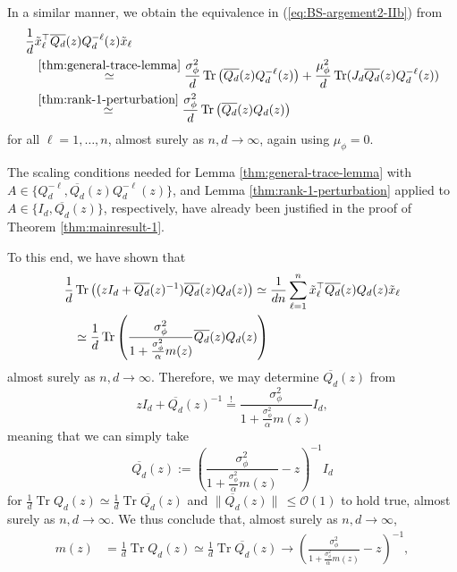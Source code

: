 \documentclass{article}
\begin{document}
\bigskip
\par
In a similar manner, we obtain the equivalence in (\ref{eq:BS-argement2-IIb}) from
\begin{align}
\frac{1}{d}&\tilde{x}_\ell^\top\overline{Q_{d}}(z)Q_{d}^{-\ell}(z)\tilde{x}_\ell 
\\ &\stackrel{\ref{thm:general-trace-lemma}}{\simeq} \frac{\sigma_\phi^2}{d}\operatorname{Tr}\left(\overline{Q_{d}}(z)Q_{d}^{-\ell}(z)\right) + \frac{\mu_\phi^2}{d}\operatorname{Tr}(J_{d}\overline{Q_{d}}(z)Q_{d}^{-\ell}(z))\label{eq:mu=0-remark}
\\ &\stackrel{\ref{thm:rank-1-perturbation}}{\simeq} \frac{\sigma_\phi^2}{d}\operatorname{Tr}\left(\overline{Q_{d}}(z)Q_{d}(z)\right)
\end{align}
for all $\ell=1,\dots,n$, almost surely as $n,d\to\infty$, again using $\mu_\phi=0$.
\bigskip
\par
The scaling conditions needed for Lemma \ref{thm:general-trace-lemma} with $A\in\{Q_d^{-\ell},\overline{Q_d}(z)Q_d^{-\ell}(z)\}$, and Lemma \ref{thm:rank-1-perturbation} applied to $A\in\{I_d,\overline{Q_d}(z)\}$, respectively, have already been justified in the proof of Theorem \ref{thm:mainresult-1}.
\bigskip
\par
To this end, we have shown that
\begin{align}
\frac{1}{d}&\operatorname{Tr}\left((zI_{d}+\overline{Q_{d}}(z)^{-1})\overline{Q_{d}}(z)Q_{d}(z)\right) \simeq \frac{1}{dn}\sum_{\ell=1}^n \tilde{x}_\ell^\top\overline{Q_{d}}(z)Q_{d}(z)\tilde{x}_\ell \notag
\\ &\simeq \frac{1}{d}\operatorname{Tr}\left(\frac{\sigma_\phi^2}{1+\frac{\sigma_\phi^2}{\alpha}m(z)}\overline{Q_{d}}(z)Q_{d}(z)\right)
\end{align}
almost surely as $n,d\to\infty$. Therefore, we may determine $\overline{Q_d}(z)$ from
\begin{equation}
zI_{d}+\overline{Q_{d}}(z)^{-1}\stackrel{!}{=}\frac{\sigma_\phi^2}{1+\frac{\sigma_\phi^2}{\alpha}m(z)}I_d,
\end{equation}
meaning that we can simply take
\begin{equation}
\overline{Q_{d}}(z):=\left(\frac{\sigma_\phi^2}{1+\frac{\sigma_\phi^2}{\alpha}m(z)}-z\right)^{-1}I_d
\end{equation}
for $\frac{1}{d}\operatorname{Tr}Q_d(z)\simeq\frac{1}{d}\operatorname{Tr}\overline{Q_d}(z)$ and $\|\overline{Q_d}(z)\|\,\leq\mathcal{O}(1)$ to hold true, almost surely as $n,d\to\infty$. We thus conclude that, almost surely as $n,d\to\infty$,
\begin{align}
m(z) &=\frac{1}{d}\operatorname{Tr}Q_{d}(z) \simeq\frac{1}{d}\operatorname{Tr}\overline{Q_{d}}(z) \to \left(\frac{\sigma_\phi^2}{1+\frac{\sigma_\phi^2}{\alpha}m(z)}-z\right)^{-1},
\end{align}
\end{document}
